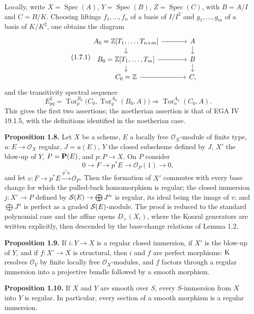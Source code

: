 \documentclass[11pt]{article}
\newcommand{\Tor}{\operatorname{Tor}}
\newcommand{\Spec}{\operatorname{Spec}}
\providecommand{\Tor}{\operatorname{Tor}}
\providecommand{\cO}{\mathcal O}
\begin{document}
Locally, write \(X=\Spec(A)\), \(Y=\Spec(B)\), \(Z=\Spec(C)\), with \(B=A/I\) and \(C=B/K\). Choosing liftings \(f_1,\ldots,f_n\) of a basis of \(I/I^2\) and \(g_1,\ldots,g_m\) of a basis of \(K/K^2\), one obtains the diagram
\begin{equation}\tag{1.7.1}
\begin{tikzcd}[column sep=large,row sep=small]
A_0=\mathbb Z[T_1,\ldots,T_{n+m}] \arrow[r] \arrow[d] & A \arrow[d]\\
B_0=\mathbb Z[T_1,\ldots,T_m] \arrow[r] \arrow[d] & B \arrow[d]\\
C_0=\mathbb Z \arrow[r] & C,
\end{tikzcd}
\end{equation}
and the transitivity spectral sequence
\begin{equation}\tag{1.7.3}
E^2_{pq}=\Tor_p^{B_0}\bigl(C_0,\Tor_q^{A_0}(B_0,A)\bigr)\Rightarrow\Tor_n^{A_0}(C_0,A).
\end{equation}
This gives the first two assertions; the noetherian assertion is that of EGA IV 19.1.5, with the definitions identified in the noetherian case.

\textbf{Proposition 1.8.} Let \(X\) be a scheme, \(E\) a locally free \(\cO_X\)-module of finite type, \(u:E\to\cO_X\) regular, \(J=u(E)\), \(Y\) the closed subscheme defined by \(J\), \(X'\) the blow-up of \(Y\), \(P=\mathbf P(E)\), and \(p:P\to X\). On \(P\) consider
\begin{equation}\tag{1.8.1}
0\to F\to p^*E\to\cO_P(1)\to0,
\end{equation}
and let \(v:F\to p^*E\xrightarrow{p^*u}\cO_P\). Then the formation of \(X'\) commutes with every base change for which the pulled-back homomorphism is regular; the closed immersion \(j:X'\to P\) defined by \(\mathcal S(E)\to\bigoplus J^n\) is regular, its ideal being the image of \(v\); and \(\bigoplus J^n\) is perfect as a graded \(\mathcal S(E)\)-module. The proof is reduced to the standard polynomial case and the affine opens \(D_+(X_i)\), where the Koszul generators are written explicitly, then descended by the base-change relations of Lemma 1.2.

\textbf{Proposition 1.9.} If \(i:Y\to X\) is a regular closed immersion, if \(X'\) is the blow-up of \(Y\), and if \(f:X'\to X\) is structural, then \(i\) and \(f\) are perfect morphisms: \(\mathrm K\) resolves \(\cO_Y\) by finite locally free \(\cO_X\)-modules, and \(f\) factors through a regular immersion into a projective bundle followed by a smooth morphism.

\textbf{Proposition 1.10.} If \(X\) and \(Y\) are smooth over \(S\), every \(S\)-immersion from \(X\) into \(Y\) is regular. In particular, every section of a smooth morphism is a regular immersion.
\end{document}

